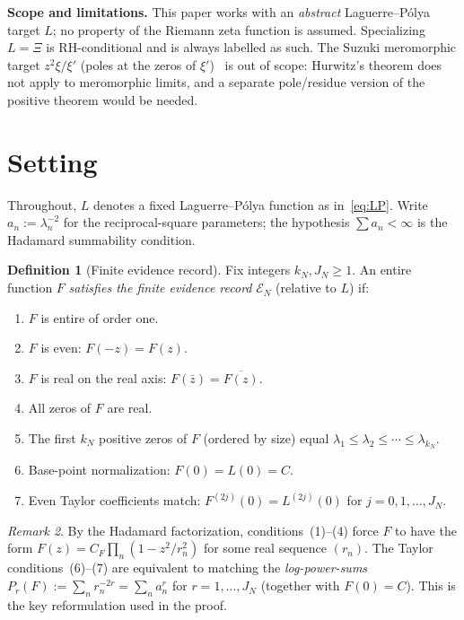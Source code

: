 \documentclass[12pt]{amsart}
\theoremstyle{definition}
\newtheorem{definition}{Definition}[section]
\theoremstyle{remark}
\newtheorem{remark}[definition]{Remark}
\theoremstyle{plain}
\begin{document}
\medskip
\noindent\textbf{Scope and limitations.}  This paper works with an
\emph{abstract} Laguerre--P\'olya target $L$; no property of the Riemann
zeta function is assumed.  Specializing $L=\Xi$ is RH-conditional and is
always labelled as such.  The Suzuki meromorphic target $z^2\xi/\xi'$
(poles at the zeros of $\xi'$)~\cite{Suzuki2026} is out of scope: Hurwitz's
theorem does not apply to meromorphic limits, and a separate pole/residue
version of the positive theorem would be needed.

\section{Setting}
\label{sec:setting}

Throughout, $L$ denotes a fixed Laguerre--P\'olya function as in~\eqref{eq:LP}.
Write $a_n:=\lambda_n^{-2}$ for the reciprocal-square parameters; the
hypothesis $\sum a_n<\infty$ is the Hadamard summability condition.

\begin{definition}[Finite evidence record]
\label{def:record}
Fix integers $k_N, J_N\geq 1$.  An entire function $F$ \emph{satisfies the
finite evidence record} $\mathcal{E}_N$ (relative to $L$) if:
\begin{enumerate}[label=(\arabic*)]
\item $F$ is entire of order one.
\item $F$ is even: $F(-z)=F(z)$.
\item $F$ is real on the real axis: $F(\bar{z})=\overline{F(z)}$.
\item All zeros of $F$ are real.
\item The first $k_N$ positive zeros of $F$ (ordered by size) equal
  $\lambda_1\leq\lambda_2\leq\cdots\leq\lambda_{k_N}$.
\item Base-point normalization: $F(0)=L(0)=C$.
\item Even Taylor coefficients match:
  $F^{(2j)}(0)=L^{(2j)}(0)$ for $j=0,1,\ldots,J_N$.
\end{enumerate}
\end{definition}

\begin{remark}
\label{rem:log-power-sums}
By the Hadamard factorization, conditions~(1)--(4) force $F$ to have the form
$F(z)=C_F\prod_{n}(1-z^2/r_n^2)$ for some real sequence $(r_n)$.  The
Taylor conditions~(6)--(7) are equivalent to matching the \emph{log-power-sums}
$P_r(F):=\sum_n r_n^{-2r}=\sum_n a_n^r$ for $r=1,\ldots,J_N$ (together with
$F(0)=C$).  This is the key reformulation used in the proof.
\end{remark}
\end{document}
